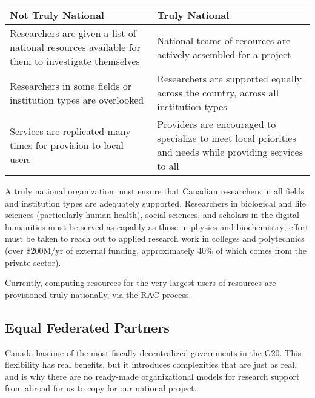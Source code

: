 \documentclass[11pt, letterpaper, twoside]{article}
\begin{document}
\begin{table}[ht]
\centering
\small {\sffamily
{}
\begin{tabular}{P{2.5in}|P{2.5in}}
\textcolor{cdaRed}{\textbf{Not Truly National}} & \textcolor{cdaRed}{\textbf{Truly National}} \\
\hline \hline
Researchers are given a list of national resources available for them to investigate themselves & National teams of resources are actively assembled for a project  \\
Researchers in some fields or institution types are overlooked & Researchers are supported equally across the country, across all institution types \\
Services are replicated many times for provision to local users & Providers are encouraged to specialize to meet local priorities and needs while providing services to all \\
\hline
\end{tabular}
}
\end{table}


A truly national organization must ensure that Canadian researchers in
all fields and institution types are adequately supported.  Researchers
in biological and life sciences (particularly human health), social
sciences, and scholars in the digital humanities must be served as
capably as those in physics and biochemistry; effort must be taken to
reach out to applied research work in colleges and polytechnics (over
\$200M/yr of external funding, approximately 40\% of which comes from
the private sector).

Currently, computing resources for the very largest users of resources
are provisioned truly nationally, via the RAC process.

\subsection*{Equal Federated Partners}
%

Canada has one of the most fiscally decentralized governments in the
G20. This flexibility has real benefits, but it introduces complexities
that are just as real, and is why there are no ready-made organizational
models for research support from abroad for us to copy for our national
project.

\end{document}
